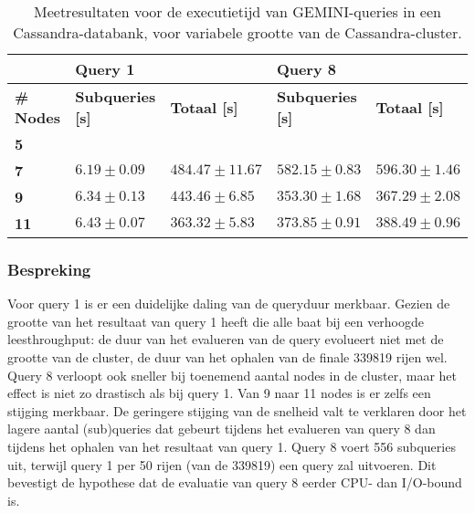 \begin{table}[!h]
\centering
\begin{tabular}{@{}lllll@{}}
\cmidrule(l){2-5}
                                       & \multicolumn{2}{|l|}{\textbf{Query 1}}                                                      & \multicolumn{2}{l|}{\textbf{Query 8}}                             \\ 
\midrule
\multicolumn{1}{|l|}{\textbf{\# Nodes}}  & \multicolumn{1}{l|}{\textbf{Subqueries [s]}}               & \multicolumn{1}{l|}{\textbf{Totaal [s]}} & \multicolumn{1}{l|}{\textbf{Subqueries [s]}} & \multicolumn{1}{l|}{\textbf{Totaal [s]}} \\ \midrule
\multicolumn{1}{|l|}{\textbf{5}} & \multicolumn{1}{l|}{$ $} & \multicolumn{1}{l|}{$ $}             & \multicolumn{1}{l|}{$ $}          & \multicolumn{1}{l|}{$ $}                        \\
\multicolumn{1}{|l|}{\textbf{7}} & \multicolumn{1}{l|}{$6.19 \pm 0.09$} &\multicolumn{1}{l|}{$484.47 \pm 11.67$}            & \multicolumn{1}{l|}{$582.15 \pm 0.83$}          & \multicolumn{1}{l|}{$596.30 \pm 1.46$}                        \\
\multicolumn{1}{|l|}{\textbf{9}} & \multicolumn{1}{l|}{$6.34 \pm 0.13$} &\multicolumn{1}{l|}{$443.46 \pm 6.85$}            & \multicolumn{1}{l|}{$353.30 \pm 1.68$}           & \multicolumn{1}{l|}{$367.29 \pm 2.08$}                        \\
\multicolumn{1}{|l|}{\textbf{11}} & \multicolumn{1}{l|}{$6.43 \pm 0.07$} &\multicolumn{1}{l|}{$363.32 \pm 5.83$}           & \multicolumn{1}{l|}{$373.85 \pm 0.91$}           & \multicolumn{1}{l|}{$388.49 \pm 0.96$}                        \\
\bottomrule
\end{tabular}
\caption{Meetresultaten voor de executietijd van GEMINI-queries in een Cassandra-databank, voor variabele grootte van de Cassandra-cluster.}
\end{table}

\subsubsection{Bespreking}

Voor query 1 is er een duidelijke daling van de queryduur merkbaar. Gezien de grootte van het resultaat van query 1 heeft die alle baat bij een verhoogde leesthroughput: de duur van het evalueren van de query evolueert niet met de grootte van de cluster, de duur van het ophalen van de finale 339819 rijen wel.\\
Query 8 verloopt ook sneller bij toenemend aantal nodes in de cluster, maar het effect is niet zo drastisch als bij query 1. Van 9 naar 11 nodes is er zelfs een stijging merkbaar. De geringere stijging van de snelheid valt te verklaren door het lagere aantal (sub)queries dat gebeurt tijdens het evalueren van query 8 dan tijdens het ophalen van het resultaat van query 1. Query 8 voert 556 subqueries uit, terwijl query 1 per 50 rijen (van de 339819) een query zal uitvoeren. Dit bevestigt de hypothese dat de evaluatie van query 8 eerder CPU- dan I/O-bound is.

